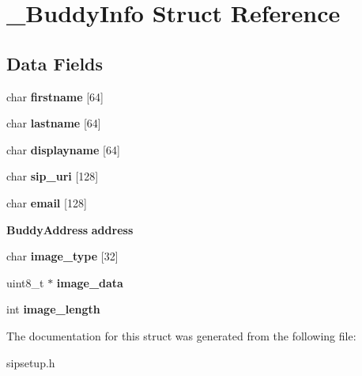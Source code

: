 \section{\+\_\+\+Buddy\+Info Struct Reference}
\label{struct__BuddyInfo}
\subsection*{Data Fields}
\begin{DoxyCompactItemize}
\item 
\mbox{\label{struct__BuddyInfo_ac7d738f6dffe084a51cb8e3883849d51}} 
char {\bfseries firstname} [64]
\item 
\mbox{\label{struct__BuddyInfo_a0d46ff9ca54908f72cdc1aacc1d4603f}} 
char {\bfseries lastname} [64]
\item 
\mbox{\label{struct__BuddyInfo_a909e6102619adc7517d89151903c2ee9}} 
char {\bfseries displayname} [64]
\item 
\mbox{\label{struct__BuddyInfo_ac37dbfafd4ab50656811bf07c4b94a57}} 
char {\bfseries sip\+\_\+uri} [128]
\item 
\mbox{\label{struct__BuddyInfo_a130388c3311e28dd9154174fc3eb9b3f}} 
char {\bfseries email} [128]
\item 
\mbox{\label{struct__BuddyInfo_ad7b79efd48b3ff35b29ea6719708f0b0}} 
\textbf{ Buddy\+Address} {\bfseries address}
\item 
\mbox{\label{struct__BuddyInfo_a3d78f1ef08e70b94dc2bd7686ef8cf98}} 
char {\bfseries image\+\_\+type} [32]
\item 
\mbox{\label{struct__BuddyInfo_ac6735871124a1f4ac55dda57c6d1f5da}} 
uint8\+\_\+t $\ast$ {\bfseries image\+\_\+data}
\item 
\mbox{\label{struct__BuddyInfo_a4512637bea02c7615ea26ba470c6054a}} 
int {\bfseries image\+\_\+length}
\end{DoxyCompactItemize}


The documentation for this struct was generated from the following file\+:\begin{DoxyCompactItemize}
\item 
sipsetup.\+h\end{DoxyCompactItemize}
